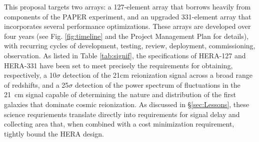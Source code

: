 \documentclass[preprint]{aastex}
\begin{document}
This proposal targets two arrays: a 127-element array that borrows heavily
from components of the PAPER experiment, and an upgraded 331-element array that
incorporates several performance optimizations.  
These arrays are developed over four years (see Fig. \ref{fig:timeline} and the Project Management Plan for details),
with recurring cycles of development, testing, review, deployment, commissioning, observation.
As listed in Table \ref{tab:signif}, the specifications of HERA-127
and HERA-331 have been set to meet precisely the requirements for obtaining,
respectively, a 10$\sigma$ detection of the 21cm reionization signal across a broad range of redshifts, and a
25$\sigma$ detection of the power spectrum of fluctuations in the 21~cm signal
capable of determining the nature and distribution of the first galaxies that
dominate cosmic reionization.  
As discussed in
\S\ref{sec:Lessons}, these science requriements translate directly into
requirements for signal delay and collecting area that, when 
combined with a cost minimization requirement, tightly
bound the HERA design.
\end{document}
